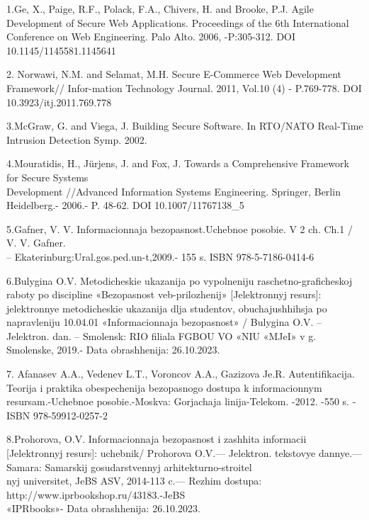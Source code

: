\begin{noparindent}

1.Ge, X., Paige, R.F., Polack, F.A., Chivers, H. and Brooke, P.J. Agile
Development of Secure Web Applications. Proceedings of the 6th
International Conference on Web Engineering. Palo Alto. 2006,
-P:305-312. DOI 10.1145/1145581.1145641

2. Norwawi, N.M. and Selamat, M.H. Secure E-Commerce Web Development
Framework// Infor-mation Technology Journal. 2011, Vol.10 (4) -
P.769-778. DOI 10.3923/itj.2011.769.778

3.McGraw, G. and Viega, J. Building Secure Software. In RTO/NATO
Real-Time Intrusion Detection Symp. 2002.

4.Mouratidis, H., Jürjens, J. and Fox, J. Towards a Comprehensive
Framework for Secure Systems\\Development //Advanced Information Systems
Engineering. Springer, Berlin Heidelberg.- 2006.- P. 48-62. DOI
10.1007/11767138\_5

5.Gafner, V. V. Informacionnaja bezopasnost\textquotesingle.Uchebnoe
posobie. V 2 ch. Ch.1 / V. V. Gafner.\\ --
Ekaterinburg:Ural.gos.ped.un-t,2009.- 155 s. ISBN 978-5-7186-0414-6

6.Bulygina O.V. Metodicheskie ukazanija po vypolneniju
raschetno-graficheskoj raboty po discipline
«Bezopasnost\textquotesingle{} veb-prilozhenij» {[}Jelektronnyj
resurs{]}: jelektronnye metodicheskie ukazanija dlja studentov,
obuchajushhihsja po napravleniju 10.04.01 «Informacionnaja
bezopasnost\textquotesingle» / Bulygina O.V. -- Jelektron. dan. --
Smolensk: RIO filiala FGBOU VO «NIU «MJeI» v g. Smolenske, 2019.- Data
obrashhenija: 26.10.2023.

7. Afanas\textquotesingle ev A.A., Veden\textquotesingle ev L.T.,
Voroncov A.A., Gazizova Je.R. Autentifikacija. Teorija i praktika
obespechenija bezopasnogo dostupa k informacionnym resursam.-Uchebnoe
posobie.-Moskva: Gorjachaja linija-Telekom. -2012. -550 s. - ISBN
978-59912-0257-2

8.Prohorova, O.V. Informacionnaja bezopasnost\textquotesingle{} i
zashhita informacii {[}Jelektronnyj resurs{]}: uchebnik/ Prohorova
O.V.--- Jelektron. tekstovye dannye.--- Samara: Samarskij
gosudarstvennyj arhitekturno-stroitel\textquotesingle \\ nyj universitet,
JeBS ASV, 2014-113 c.--- Rezhim dostupa:
http://www.iprbookshop.ru/43183.-JeBS\\ «IPRbooks»- Data obrashhenija:
26.10.2023.


\end{noparindent}
